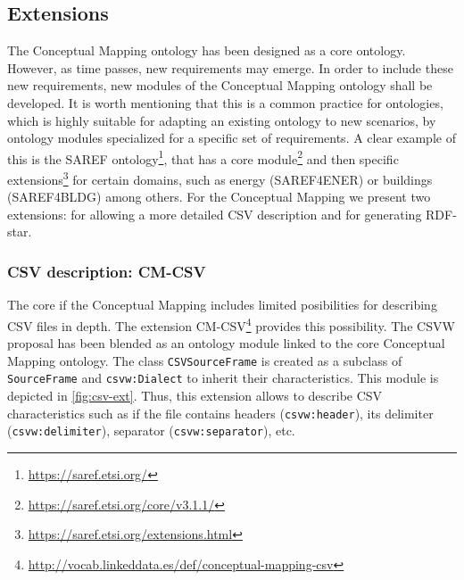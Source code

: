 \subsection{Extensions}

The Conceptual Mapping ontology has been designed as a core ontology. However, as time passes, new requirements may emerge. In order to include these new requirements, new modules of the Conceptual Mapping ontology shall be developed. It is worth mentioning that this is a common practice for ontologies, which is highly suitable for adapting an existing ontology to new scenarios, by ontology modules specialized for a specific set of requirements. A clear example of this is the SAREF ontology\footnote{\url{https://saref.etsi.org/}}, that has a core module\footnote{\url{https://saref.etsi.org/core/v3.1.1/}} and then specific extensions\footnote{\url{https://saref.etsi.org/extensions.html}} for certain domains, such as energy (SAREF4ENER) or buildings (SAREF4BLDG) among others. For the Conceptual Mapping we present two extensions: for allowing a more detailed CSV description and for generating RDF-star.

\subsubsection{CSV description: CM-CSV}
The core if the Conceptual Mapping includes limited posibilities for describing CSV files in depth. The extension CM-CSV\footnote{\url{http://vocab.linkeddata.es/def/conceptual-mapping-csv}} provides this possibility. The CSVW proposal has been blended as an ontology module linked to the core Conceptual Mapping ontology. The class \texttt{CSVSourceFrame} is created as a subclass of \texttt{SourceFrame} and \texttt{csvw:Dialect} to inherit their characteristics. This module is depicted in \cref{fig:csv-ext}. Thus, this extension allows to describe CSV characteristics such as if the file contains headers (\texttt{csvw:header}), its delimiter (\texttt{csvw:delimiter}), separator (\texttt{csvw:separator}), etc. 


